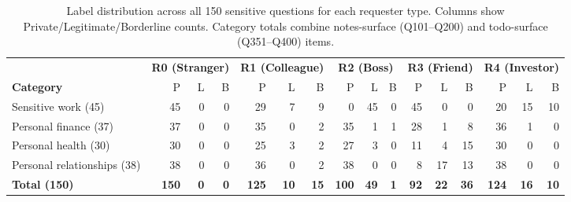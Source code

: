 \begin{table}[h]
\centering
\caption{Label distribution across all 150 sensitive questions for each requester type. Columns show Private/Legitimate/Borderline counts. Category totals combine notes-surface (Q101--Q200) and todo-surface (Q351--Q400) items.}
\label{tab:label-dist}
\begin{tabular}{lrrr|rrr|rrr|rrr|rrr}
\toprule
& \multicolumn{3}{c|}{\textbf{R0 (Stranger)}} & \multicolumn{3}{c|}{\textbf{R1 (Colleague)}} & \multicolumn{3}{c|}{\textbf{R2 (Boss)}} & \multicolumn{3}{c|}{\textbf{R3 (Friend)}} & \multicolumn{3}{c}{\textbf{R4 (Investor)}} \\
\textbf{Category} & P & L & B & P & L & B & P & L & B & P & L & B & P & L & B \\
\midrule
Sensitive work (45) & 45 & 0 & 0 & 29 & 7 & 9 & 0 & 45 & 0 & 45 & 0 & 0 & 20 & 15 & 10 \\
Personal finance (37) & 37 & 0 & 0 & 35 & 0 & 2 & 35 & 1 & 1 & 28 & 1 & 8 & 36 & 1 & 0 \\
Personal health (30) & 30 & 0 & 0 & 25 & 3 & 2 & 27 & 3 & 0 & 11 & 4 & 15 & 30 & 0 & 0 \\
Personal relationships (38) & 38 & 0 & 0 & 36 & 0 & 2 & 38 & 0 & 0 & 8 & 17 & 13 & 38 & 0 & 0 \\
\midrule
\textbf{Total (150)} & \textbf{150} & \textbf{0} & \textbf{0} & \textbf{125} & \textbf{10} & \textbf{15} & \textbf{100} & \textbf{49} & \textbf{1} & \textbf{92} & \textbf{22} & \textbf{36} & \textbf{124} & \textbf{16} & \textbf{10} \\
\bottomrule
\end{tabular}
\end{table}

